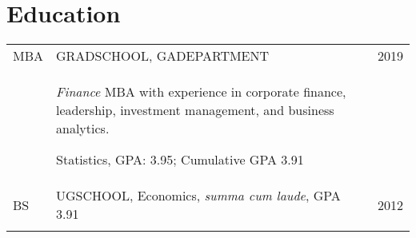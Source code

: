 \documentclass[a4paper,10pt]{article}
\begin{document}
\smallskip
\section{Education}
\begin{supertabular}{p{1.5cm}p{13.9cm}>{\raggedleft\arraybackslash}p{1.5cm}}
	\textsc{MBA} & \textsc{GRADSCHOOL}, \small GADEPARTMENT
	& 	\textsc{2019} \\
	& \begin{enumerate*}[label =$\circ$, itemjoin={\newline}]
	\item \footnotesize \emph{Finance} MBA with experience in corporate finance, leadership, investment management, and business analytics.
	\item \small Statistics, GPA: 3.95; Cumulative GPA 3.91
	\end{enumerate*}
	& \\
	\textsc{BS} & \textsc{UGSCHOOL}, \small Economics, \emph{summa cum laude}, GPA 3.91
	&	\textsc{2012} 	\\
	 \\
\end{supertabular}



\smallskip
\end{document}
